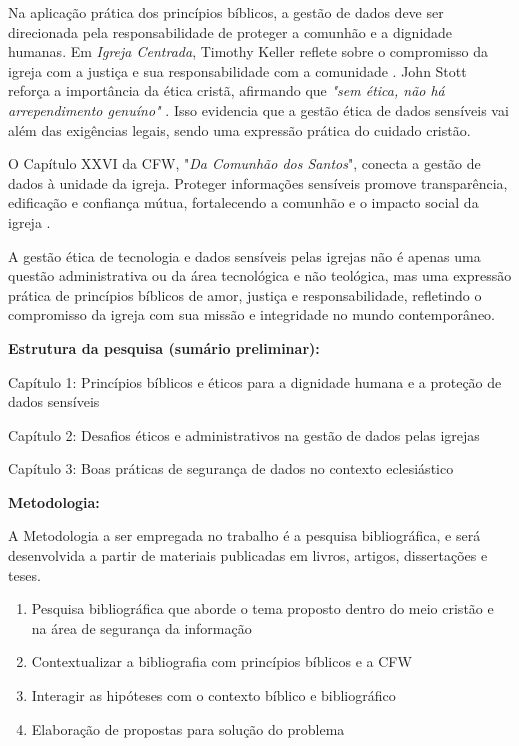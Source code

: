 \documentclass[12pt,a4paper]{article}
\begin{document}
Na aplicação prática dos princípios bíblicos, a gestão de dados deve ser direcionada pela responsabilidade de proteger a comunhão e a dignidade humanas. Em \textit{Igreja Centrada}, Timothy Keller reflete sobre o compromisso da igreja com a justiça e sua responsabilidade com a comunidade \cite[p. 209]{keller2014}. John Stott reforça a importância da ética cristã, afirmando que \textit{"sem ética, não há arrependimento genuíno"} \cite[p. 51]{stott2008}. Isso evidencia que a gestão ética de dados sensíveis vai além das exigências legais, sendo uma expressão prática do cuidado cristão.

O Capítulo XXVI da CFW, "\textit{Da Comunhão dos Santos}", conecta a gestão de dados à unidade da igreja. Proteger informações sensíveis promove transparência, edificação e confiança mútua, fortalecendo a comunhão e o impacto social da igreja \cite{cfw}.

A gestão ética de tecnologia e dados sensíveis pelas igrejas não é apenas uma questão administrativa ou da área tecnológica e não teológica, mas uma expressão prática de princípios bíblicos de amor, justiça e responsabilidade, refletindo o compromisso da igreja com sua missão e integridade no mundo contemporâneo.

\noindent
\textbf{Estrutura da pesquisa (sumário preliminar):}

\noindent
Capítulo 1: Princípios bíblicos e éticos para a dignidade humana e a proteção de dados sensíveis

\noindent
Capítulo 2: Desafios éticos e administrativos na gestão de dados pelas igrejas

\noindent
Capítulo 3: Boas práticas de segurança de dados no contexto eclesiástico

\noindent
\textbf{Metodologia:}

A Metodologia a ser empregada no trabalho é a pesquisa bibliográfica, e será desenvolvida a partir de materiais publicadas em livros, artigos, dissertações e teses.
\begin{enumerate}
    \item Pesquisa bibliográfica que aborde o tema proposto dentro do meio cristão e na área de segurança da informação
    \item Contextualizar a bibliografia com princípios bíblicos e a CFW
    \item Interagir as hipóteses com o contexto bíblico e bibliográfico
    \item Elaboração de propostas para solução do problema
\end{enumerate}




\end{document}
